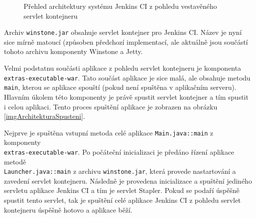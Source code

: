             \begin{figure}[h!t]
                \begin{center}
                    \caption{Přehled architektury systému Jenkins CI z pohledu vestavěného servlet kontejneru}
                    \label{imgArchitekturaServlet}
                \end{center}
            \end{figure}

            
            Archiv \texttt{winstone.jar} obsahuje servlet kontejner pro Jenkins CI. Název je nyní sice mírně matoucí
            (způsoben předchozí implementací, ale aktuálně jsou součástí tohoto archivu komponenty Winstone a Jetty.

            Velmi podstatnu součásti aplikace z pohledu servlet kontejneru je komponenta\\\texttt{extras-executable-war}. 
            Tato součást aplikace je sice malá, ale obsahuje metodu \texttt{main}, kterou se aplikace spouští 
            (pokud není spuštěna v aplikačním serveru). Hlavním úkolem této komponenty je právě spustit 
            servlet kontejner a tím spustit i celou aplikaci. Tento proces spuštění aplikace je zobrazen
            na obrázku \ref{imgArchitekturaSpusteni}.

            Nejprve je spuštěna vstupní metoda celé aplikace \texttt{Main.java::main} z komponenty\\\texttt{extras-executable-war}.
            Po počáteční inicializaci je předáno řízení aplikace metodě \\\texttt{Launcher.java::main}
            z archivu \texttt{winstone.jar}, která provede nastartování a 
            zavedení servlet kontejneru. Následně je provedena inicializace a spuštění
            jediného servletu aplikace Jenkins CI a tím je servlet Stapler. %
            Pokud se podaří úspěšně spustit tento servlet, tak je spuštění celé aplikace Jenkins CI z pohledu
            servlet kontejneru úspěšně hotovo a aplikace běží.

